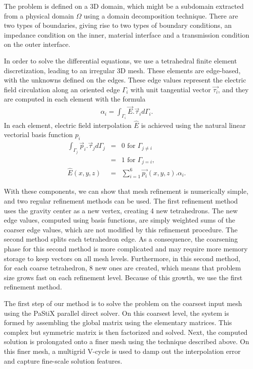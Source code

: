 \documentclass{report}
\begin{document}
The problem is defined on a 3D domain, which might be a subdomain extracted
from a physical domain $\Omega$ using a domain decomposition technique. There
are two types of boundaries, giving rise to two types of boundary conditions,
an impedance condition on the inner, material interface
and a transmission condition on the outer interface.

In order to solve the differential equations, we use a tetrahedral
{\nedelec} finite element discretization, leading to an irregular 3D
mesh. These elements are
edge-based, with the unknowns defined on the edges. These edge values
represent the electric field circulation along an oriented edge
$\Gamma_i$ with unit tangential vector $\vec{\tau_i}$, and they are
computed in each element with the formula
\begin{eqnarray*}
\alpha_i = \int_{\Gamma_i}{\vec E. \vec \tau_i} d{\Gamma_i}.
\end{eqnarray*}
In each element, electric field interpolation $\hat{E}$ is achieved
using the natural linear vectorial basis function $p_i$
\begin{eqnarray*}
\int_{\Gamma_j}{\vec p_i. \vec \tau_j} d{\Gamma_j}
&=& 0 \textrm{ for } \Gamma_{j \neq i} \\
&=& 1 \textrm{ for } \Gamma_{j=i},\\
\hat{E}(x,y,z) &=& \sum_{i=1}^{6}{ \vec{p_i}(x,y,z).\alpha_i}.
\end{eqnarray*}

With these components, we can show that mesh refinement is numerically
simple, and two regular refinement methods can be used. The
first refinement method uses the gravity center as a new vertex,
creating 4 new tetrahedrons. The new edge values, computed using
{\nedelec} basis functions, are simply weighted sums of the coarser
edge values, which are not modified by this refinement procedure. The second method
splits each tetrahedron edge. As a consequence, the coarsening phase
for this second method is more complicated and may require more memory
storage to keep vectors on all mesh levels. Furthermore, in this
second method, for each coarse tetrahedron, 8 new ones are created,
which means that problem size grows fast on each refinement level. Because of
this growth, we use the first refinement method.

The first step of our method is to solve the problem on the coarsest
input mesh using the PaStiX parallel direct solver. On this coarsest
level, the system is formed by assembling the global matrix using the
elementary matrices. This complex but symmetric matrix is then
factorized and solved. Next, the computed solution is prolongated onto
a finer mesh using the technique described above. On this finer
mesh, a multigrid V-cycle is used to damp out the interpolation error
and capture fine-scale solution features.
\end{document}

